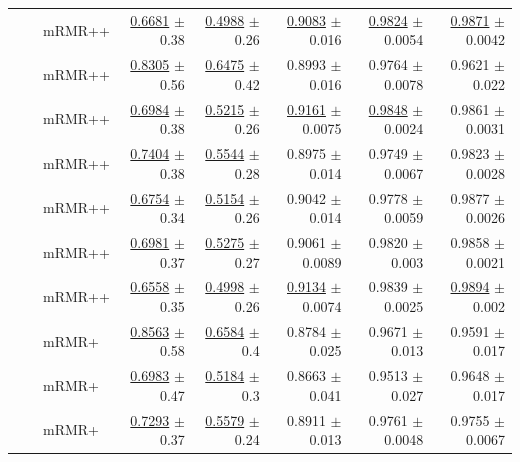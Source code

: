 \begin{longtable}{llp{}rrrrr}
 &  & mRMR++ & \underline{0.6681} {\scriptsize $\pm$ 0.38} & \underline{0.4988} {\scriptsize $\pm$ 0.26} & \underline{0.9083} {\scriptsize $\pm$ 0.016} & \underline{0.9824} {\scriptsize $\pm$ 0.0054} & \underline{0.9871} {\scriptsize $\pm$ 0.0042} \\
 &  & mRMR++ & \underline{0.8305} {\scriptsize $\pm$ 0.56} & \underline{0.6475} {\scriptsize $\pm$ 0.42} & 0.8993 {\scriptsize $\pm$ 0.016} & 0.9764 {\scriptsize $\pm$ 0.0078} & 0.9621 {\scriptsize $\pm$ 0.022} \\
 &  & mRMR++ & \underline{0.6984} {\scriptsize $\pm$ 0.38} & \underline{0.5215} {\scriptsize $\pm$ 0.26} & \underline{0.9161} {\scriptsize $\pm$ 0.0075} & \underline{0.9848} {\scriptsize $\pm$ 0.0024} & 0.9861 {\scriptsize $\pm$ 0.0031} \\
 &  & mRMR++ & \underline{0.7404} {\scriptsize $\pm$ 0.38} & \underline{0.5544} {\scriptsize $\pm$ 0.28} & 0.8975 {\scriptsize $\pm$ 0.014} & 0.9749 {\scriptsize $\pm$ 0.0067} & 0.9823 {\scriptsize $\pm$ 0.0028} \\
 &  & mRMR++ & \underline{0.6754} {\scriptsize $\pm$ 0.34} & \underline{0.5154} {\scriptsize $\pm$ 0.26} & 0.9042 {\scriptsize $\pm$ 0.014} & 0.9778 {\scriptsize $\pm$ 0.0059} & 0.9877 {\scriptsize $\pm$ 0.0026} \\
 &  & mRMR++ & \underline{0.6981} {\scriptsize $\pm$ 0.37} & \underline{0.5275} {\scriptsize $\pm$ 0.27} & 0.9061 {\scriptsize $\pm$ 0.0089} & 0.9820 {\scriptsize $\pm$ 0.003} & 0.9858 {\scriptsize $\pm$ 0.0021} \\
 &  & mRMR++ & \underline{0.6558} {\scriptsize $\pm$ 0.35} & \underline{0.4998} {\scriptsize $\pm$ 0.26} & \underline{0.9134} {\scriptsize $\pm$ 0.0074} & 0.9839 {\scriptsize $\pm$ 0.0025} & \underline{0.9894} {\scriptsize $\pm$ 0.002} \\
 &  & mRMR+ & \underline{0.8563} {\scriptsize $\pm$ 0.58} & \underline{0.6584} {\scriptsize $\pm$ 0.4} & 0.8784 {\scriptsize $\pm$ 0.025} & 0.9671 {\scriptsize $\pm$ 0.013} & 0.9591 {\scriptsize $\pm$ 0.017} \\
 &  & mRMR+ & \underline{0.6983} {\scriptsize $\pm$ 0.47} & \underline{0.5184} {\scriptsize $\pm$ 0.3} & 0.8663 {\scriptsize $\pm$ 0.041} & 0.9513 {\scriptsize $\pm$ 0.027} & 0.9648 {\scriptsize $\pm$ 0.017} \\
 &  & mRMR+ & \underline{0.7293} {\scriptsize $\pm$ 0.37} & \underline{0.5579} {\scriptsize $\pm$ 0.24} & 0.8911 {\scriptsize $\pm$ 0.013} & 0.9761 {\scriptsize $\pm$ 0.0048} & 0.9755 {\scriptsize $\pm$ 0.0067} \\

\end{longtable}
